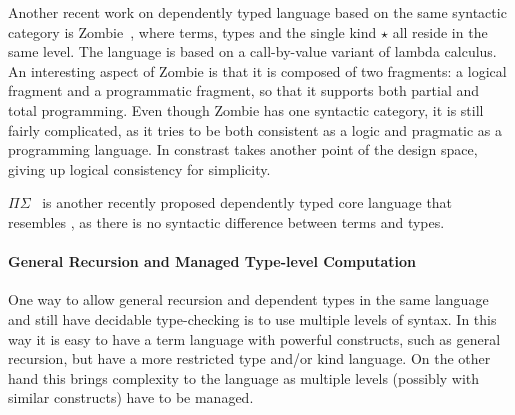 \begin{comment}
Since the implicit conversion of the lambda
cube is not syntax-directed, they come up with a approach to
strategically distribute the conversion rule over the other typing
rules. In retrospect, Henk is quite conservative in terms of
type-level computation. Actually it is not even a dependently typed
language, as they clearly state that they don't allow types to depend
on terms. As for recursion, even though it has a full lambda calculus
at the type level, recursion is disallowed. In Henk the authors have
not attempted to prove any meta-theoretic results.
\end{comment}

Another recent work on dependently typed language based on the same
syntactic category is \textsf{Zombie}~\cite{zombie:popl14,
  zombie:thesis}, where terms, types and the single kind $\star$ all
reside in the same level. The language is based on a call-by-value
variant of lambda calculus. An interesting aspect of Zombie is that
it is composed of two fragments: a logical fragment and a programmatic
fragment, so that it supports both partial and total programming. Even
though Zombie has one syntactic category, it is still fairly
complicated, as it tries to be both consistent as a logic and
pragmatic as a programming language. In constrast \name takes 
another point of the design space, giving up logical consistency 
for simplicity.

$\Pi\Sigma$~\cite{dep:pisigma} is another recently proposed
dependently typed core language that resembles \name, as there is no
syntactic difference between terms and types.

\paragraph{General Recursion and Managed Type-level Computation}
One way to allow general recursion and dependent types in the same
language and still have decidable type-checking is to use multiple
levels of syntax. In this way it is easy to have a term language with 
powerful constructs, such as general recursion, but have a more
restricted type and/or kind language. On the other hand this brings 
complexity to the language as multiple levels (possibly with similar
constructs) have to be managed.


